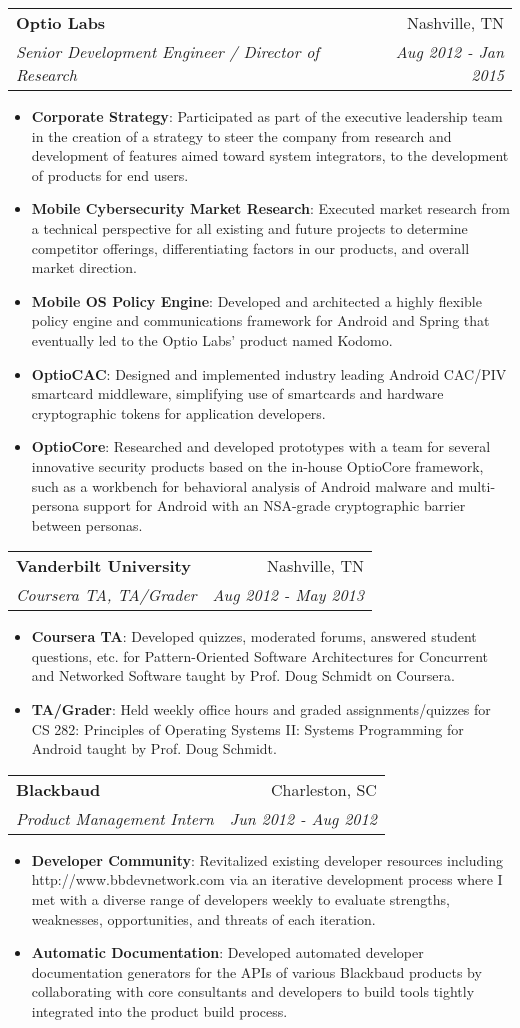 \documentclass[letterpaper,10pt]{article}
\makeatletter
\newcommand{\resumeItem}[2]{
  \item\small{
    \textbf{#1}{: #2 \vspace{-2pt}}
  }
}
\newcommand{\resumeSubheading}[4]{
  \vspace{-1pt}\item
    \begin{tabular*}{0.97\textwidth}{l@{\extracolsep{\fill}}r}
      \textbf{#1} & #2 \\
      \textit{\small#3} & \textit{\small #4} \\
    \end{tabular*}\vspace{-5pt}
}
\newcommand{\resumeItemListStart}{\begin{itemize}}
\newcommand{\resumeItemListEnd}{\end{itemize}\vspace{-5pt}}
\makeatother
\begin{document}
    \resumeSubheading
      {Optio Labs}{Nashville, TN}
      {Senior Development Engineer / Director of Research}{Aug 2012 - Jan 2015}
      \resumeItemListStart
        \resumeItem{Corporate Strategy}
          {Participated as part of the executive leadership team in the creation of a strategy to steer the company from research and development of features aimed toward system integrators, to the development of products for end users.}
        \resumeItem{Mobile Cybersecurity Market Research}
          {Executed market research from a technical perspective for all existing and future projects to determine competitor offerings, differentiating factors in our products, and overall market direction.}
        \resumeItem{Mobile OS Policy Engine}
          {Developed and architected a highly flexible policy engine and communications framework for Android and Spring that eventually led to the Optio Labs’ product named Kodomo.}
        \resumeItem{OptioCAC}
          {Designed and implemented industry leading Android CAC/PIV smartcard middleware, simplifying use of smartcards and hardware cryptographic tokens for application developers.}
        \resumeItem{OptioCore}
          {Researched and developed prototypes with a team for several innovative security products based on the in-house OptioCore framework, such as a workbench for behavioral analysis of Android malware and multi-persona support for Android with an NSA-grade cryptographic barrier between personas.}
      \resumeItemListEnd
      
    \resumeSubheading
      {Vanderbilt University}{Nashville, TN}
      {Coursera TA, TA/Grader}{Aug 2012 - May 2013}
      \resumeItemListStart
        \resumeItem{Coursera TA}
          {Developed quizzes, moderated forums, answered student questions, etc. for Pattern-Oriented Software Architectures for Concurrent and Networked Software taught by Prof. Doug Schmidt on Coursera.}
        \resumeItem{TA/Grader}
          {Held weekly office hours and graded assignments/quizzes for CS 282: Principles of Operating Systems II: Systems Programming for Android taught by Prof. Doug Schmidt.}
      \resumeItemListEnd
      
    \resumeSubheading
      {Blackbaud}{Charleston, SC}
      {Product Management Intern}{Jun 2012 - Aug 2012}
      \resumeItemListStart
        \resumeItem{Developer Community}
          {Revitalized existing developer resources including http://www.bbdevnetwork.com via an iterative development process where I met with a diverse range of developers weekly to evaluate strengths, weaknesses, opportunities, and threats of each iteration.}
        \resumeItem{Automatic Documentation}
          {Developed automated developer documentation generators for the APIs of various Blackbaud products by collaborating with core consultants and developers to build tools tightly integrated into the product build process.}
      \resumeItemListEnd
\end{document}

